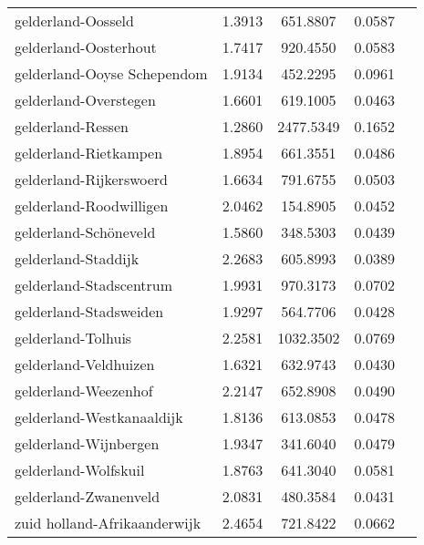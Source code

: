 \begin{longtable}{llccc}
	gelderland-Oosseld                        & 1.3913  & 651.8807  & 0.0587                 \\
	gelderland-Oosterhout                     & 1.7417  & 920.4550  & 0.0583                 \\
	gelderland-Ooyse Schependom               & 1.9134  & 452.2295  & 0.0961                 \\
	gelderland-Overstegen                     & 1.6601  & 619.1005  & 0.0463                 \\
	gelderland-Ressen                         & 1.2860  & 2477.5349 & 0.1652                 \\
	gelderland-Rietkampen                     & 1.8954  & 661.3551  & 0.0486                 \\
	gelderland-Rijkerswoerd                   & 1.6634  & 791.6755  & 0.0503                 \\
	gelderland-Roodwilligen                   & 2.0462  & 154.8905  & 0.0452                 \\
	gelderland-Schöneveld                     & 1.5860  & 348.5303  & 0.0439                 \\
	gelderland-Staddijk                       & 2.2683  & 605.8993  & 0.0389                 \\
	gelderland-Stadscentrum                   & 1.9931  & 970.3173  & 0.0702                 \\
	gelderland-Stadsweiden                    & 1.9297  & 564.7706  & 0.0428                 \\
	gelderland-Tolhuis                        & 2.2581  & 1032.3502 & 0.0769                 \\
	gelderland-Veldhuizen                     & 1.6321  & 632.9743  & 0.0430                 \\
	gelderland-Weezenhof                      & 2.2147  & 652.8908  & 0.0490                 \\
	gelderland-Westkanaaldijk                 & 1.8136  & 613.0853  & 0.0478                 \\
	gelderland-Wijnbergen                     & 1.9347  & 341.6040  & 0.0479                 \\
	gelderland-Wolfskuil                      & 1.8763  & 641.3040  & 0.0581                 \\
	gelderland-Zwanenveld                     & 2.0831  & 480.3584  & 0.0431                 \\
	zuid holland-Afrikaanderwijk              & 2.4654  & 721.8422  & 0.0662                 \\

\end{longtable}
